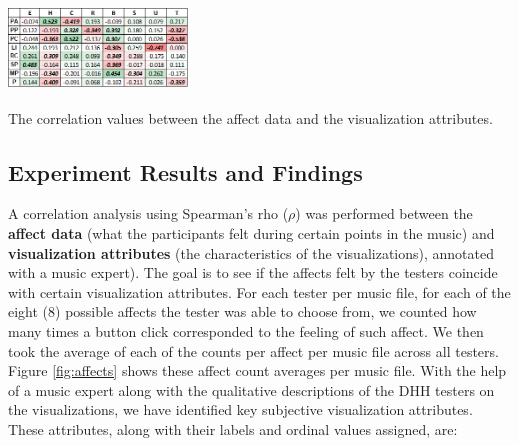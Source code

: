 \documentclass{sigchi-ext}
\begin{document}
\begin{marginfigure}[1pc]
\begin{minipage}{\marginparwidth}
     \includegraphics[width=4.75cm,height=2.25cm]{figures/AffectVisualization.png}
    \caption{The correlation values between the affect data and the visualization attributes.}
    \label{fig:correlation}
    \end{minipage}
\end{marginfigure}

\subsection{Experiment Results and Findings}
A correlation analysis using Spearman's rho ($\rho$) was performed between the \textbf{affect data} (what the participants felt during certain points in the music) and \textbf{visualization attributes} (the characteristics of the visualizations), annotated with a music expert). The goal is to see if the affects felt by the testers coincide with certain visualization attributes. For each tester per music file, for each of the eight (8) possible affects the tester was able to choose from, we counted how many times a button click corresponded to the feeling of such affect. We then took the average of each of the counts per affect per music file across all testers. Figure \ref{fig:affects} shows these affect count averages per music file.%
With the help of a music expert along with the qualitative descriptions of the DHH testers on the visualizations, we have identified key subjective visualization attributes. These attributes, along with their labels and ordinal values assigned, are:
\end{document}
